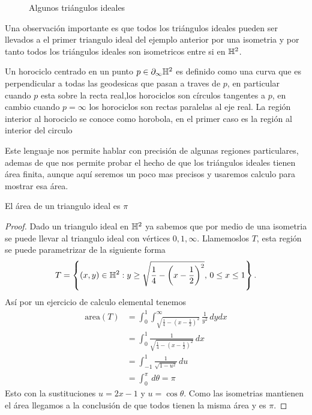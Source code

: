         \begin{figure}[H]
        \centering
        
            \caption{Algunos triángulos ideales}
        \end{figure}

    \begin{note}
        Una observación importante es que todos los triángulos ideales pueden ser llevados a el primer triangulo ideal del ejemplo anterior por una isometria y por tanto todos los triángulos ideales son isometricos entre si en $\mathbb{H}^2$.
    \end{note}

    \begin{definition}
        Un horociclo centrado en un punto $p\in\partial_\infty\mathbb{H}^2$ es definido como una curva que es perpendicular a todas las geodesicas que pasan a traves de $p$, en particular cuando $p$ esta sobre la recta real,los horociclos son círculos tangentes a $p$, en cambio cuando $p=\infty$ los horociclos son rectas paralelas al eje real. La región interior al horociclo se conoce como horobola, en el primer caso es la región al interior del circulo
    \end{definition}

    Este lenguaje nos permite hablar con precisión de algunas regiones particulares, ademas de que nos permite probar el hecho de que los triángulos ideales tienen área finita, aunque aquí seremos un poco mas precisos y usaremos calculo para mostrar esa área.

    \begin{lemma}
        El área de un triangulo ideal es $\pi$
    \end{lemma}

    \begin{proof}
        Dado un triangulo ideal en $\mathbb{H}^2$ ya sabemos que por medio de una isometria se puede llevar al triangulo ideal con vértices $0,1,\infty.$ Llamemoslos $T$, esta región se puede parametrizar de la siguiente forma 
        $$T=\left\{(x,y)\in\mathbb{H}^2: y\geq \sqrt{\frac{1}{4}-\left(x-\frac{1}{2}\right)^2},\,0\leq x\leq 1\right\}.$$
        Así por un ejercicio de calculo elemental tenemos
        \begin{align*}
            \text{area}(T)&=\int_0^1\int_{\sqrt{\frac{1}{4}-\left(x-\frac{1}{2}\right)^2}}^\infty\frac{1}{y^2}\,dydx\\
            &=\int_0^1\frac{1}{\sqrt{\frac{1}{4}-\left(x-\frac{1}{2}\right)^2}}\,dx\\
            &=\int_{-1}^1\frac{1}{\sqrt{1-u^2}}\,du\\
            &=\int_0^\pi\,d\theta=\pi
        \end{align*}
        Esto con la sustituciones $u=2x-1$ y $u=\cos \theta$. Como las isometrias mantienen el área llegamos a la conclusión de que todos tienen la misma área y es $\pi$.
    
    \end{proof}

